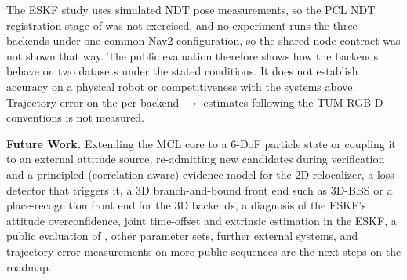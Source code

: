 The ESKF study uses simulated NDT pose measurements, so the PCL NDT registration stage of  was not exercised, and no experiment runs the three backends under one common Nav2 configuration, so the shared node contract was not shown that way.
The public evaluation therefore shows how the backends behave on two datasets under the stated conditions. It does not establish accuracy on a physical robot or competitiveness with the systems above. Trajectory error on the per-backend $\to$ estimates following the TUM RGB-D conventions \citep{sturm2012benchmark} is not measured.

\noindent\textbf{Future Work.} Extending the MCL core to a 6-DoF particle state or coupling it to an external attitude source, re-admitting new candidates during verification and a principled (correlation-aware) evidence model for the 2D relocalizer, a loss detector that triggers it, a 3D branch-and-bound front end such as 3D-BBS \citep{aoki2024bbs3d} or a place-recognition front end for the 3D backends, a diagnosis of the ESKF's attitude overconfidence, joint time-offset and extrinsic estimation in the ESKF, a public evaluation of , other  parameter sets, further external systems, and trajectory-error measurements on more public sequences are the next steps on the roadmap.
